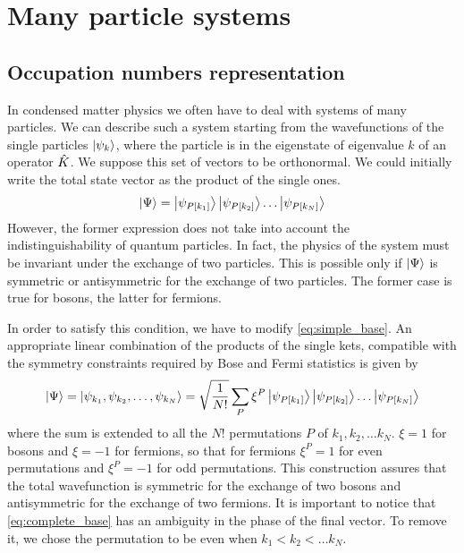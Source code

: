 \section{Many particle systems}
\subsection{Occupation numbers representation}
In condensed matter physics we often have to deal with systems of many particles. We can describe such a system starting from the wavefunctions of the single particles $\ket{\psi_k}$, where the particle is in the eigenstate of eigenvalue $k$ of an operator $\hat{K}$. We suppose this set of vectors to be orthonormal. We could initially write the total state vector as the product of the single ones.
\begin{equation} \label{eq:simple_base}
    \ket{\Psi} = \ket{\psi_{P[k_1]}}\ket{\psi_{P[k_2]}}\dots\ket{\psi_{P[k_N]}}
\end{equation}
However, the former expression does not take into account the indistinguishability of quantum particles. In fact, the physics of the system must be invariant under the exchange of two particles. This is possible only if $\ket{\Psi}$ is symmetric or antisymmetric for the exchange of two particles. The former case is true for bosons, the latter for fermions. %

In order to satisfy this condition, we have to modify \cref{eq:simple_base}. An appropriate linear combination of the products of the single kets, compatible with the symmetry constraints required by Bose and Fermi statistics is given by
\begin{equation} \label{eq:complete_base}
    \ket{\Psi} = \ket{\psi_{k_1}, \psi_{k_2}, \dots, \psi_{k_N}} = \sqrt{\frac{1}{N!}} \sum_P \xi^P \ket{\psi_{P[k_1]}}\ket{\psi_{P[k_2]}}\dots\ket{\psi_{P[k_N]}}
\end{equation}
where the sum is extended to all the $N!$ permutations $P$ of ${k_1, k_2, \dots k_N}$. $\xi = 1$ for bosons and $\xi = -1$ for fermions, so that for fermions $\xi^P = 1$ for even permutations and $\xi^P = -1$ for odd permutations. This construction assures that the total wavefunction is symmetric for the exchange of two bosons and antisymmetric for the exchange of two fermions. It is important to notice that \cref{eq:complete_base} has an ambiguity in the phase of the final vector. To remove it, we chose the permutation to be even when $k_1 < k_2 < \dots k_N$.

